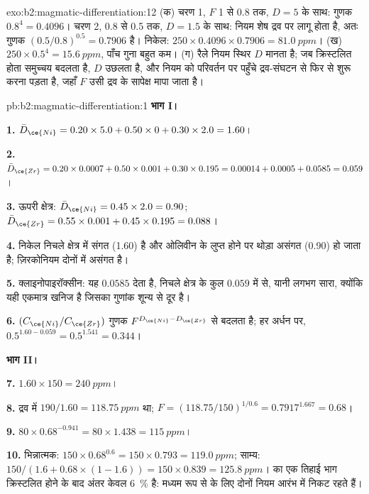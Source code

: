 \begin{solution}{exo:b2:magmatic-differentiation:12}
(क) चरण 1, $F$ 1 से 0.8 तक, $D = 5$ के साथ: गुणक $0.8^{4} = 0.4096$। चरण 2,
0.8 से 0.5 तक, $D = 1.5$ के साथ: नियम शेष द्रव पर लागू होता है, अतः
गुणक $(0.5/0.8)^{0.5} = 0.7906$ है। निकेल: $250\times0.4096\times0.7906 =
\qty{81.0}{ppm}$। (ख) $250\times0.5^{4} = \qty{15.6}{ppm}$, पाँच गुना बहुत कम। (ग)
रैले नियम स्थिर $D$ मानता है; जब क्रिस्टलित होता समुच्चय बदलता है,
$D$ उछलता है, और नियम को परिवर्तन पर पहुँचे द्रव-संघटन से फिर से शुरू करना पड़ता है,
जहाँ $F$ उसी द्रव के सापेक्ष मापा जाता है।
\end{solution}

\begin{solution}{pb:b2:magmatic-differentiation:1}
\noindent\textbf{भाग I।}

\textbf{1.} $\bar D_{\ce{Ni}} = 0.20\times5.0 + 0.50\times0 + 0.30\times2.0 = 1.60$।

\textbf{2.} $\bar D_{\ce{Zr}} = 0.20\times0.0007 + 0.50\times0.001 + 0.30\times0.195 =
0.00014 + 0.0005 + 0.0585 = 0.059$।

\textbf{3.} ऊपरी क्षेत्र: $\bar D_{\ce{Ni}} = 0.45\times2.0 = 0.90$; $\bar D_{\ce{Zr}} =
0.55\times0.001 + 0.45\times0.195 = 0.088$।

\textbf{4.} निकेल निचले क्षेत्र में संगत (1.60) है और ओलिवीन के लुप्त होने पर थोड़ा
असंगत (0.90) हो जाता है; ज़िरकोनियम दोनों में असंगत है।

\textbf{5.} क्लाइनोपाइरॉक्सीन: यह $0.0585$ देता है, निचले क्षेत्र के कुल $0.059$ में से, यानी लगभग
सारा, क्योंकि यही एकमात्र खनिज है जिसका गुणांक शून्य से दूर है।

\textbf{6.} $(C_{\ce{Ni}}/C_{\ce{Zr}})$ गुणक $F^{D_{\ce{Ni}} - D_{\ce{Zr}}}$ से बदलता है;
हर अर्धन पर, $0.5^{1.60 - 0.059} = 0.5^{1.541} = 0.344$।

\noindent\textbf{भाग II।}

\textbf{7.} $1.60\times150 = \qty{240}{ppm}$।

\textbf{8.} द्रव में $190/1.60 = \qty{118.75}{ppm}$ था; $F = (118.75/150)^{1/0.6} =
0.7917^{1.667} = 0.68$।

\textbf{9.} $80\times0.68^{-0.941} = 80\times1.438 = \qty{115}{ppm}$।

\textbf{10.} भिन्नात्मक: $150\times0.68^{0.6} = 150\times0.793 = \qty{119.0}{ppm}$;
साम्य: $150/(1.6 + 0.68\times(1 - 1.6)) = 150\times0.839 = \qty{125.8}{ppm}$।
 का एक तिहाई भाग क्रिस्टलित होने के बाद अंतर केवल \qty{6}{\percent} है:
मध्यम रूप से  के लिए दोनों नियम आरंभ में निकट रहते हैं।


\end{solution}
